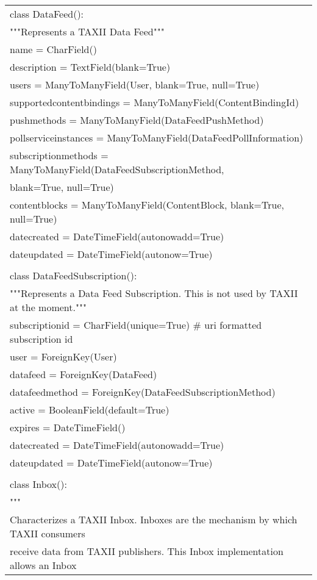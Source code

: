 \begin{center}
\begin{longtable}{|l|}
	\\
	class DataFeed():\\
	    """Represents a TAXII Data Feed"""\\
	    name = CharField()\\
	    description = TextField(blank=True)\\
	    users = ManyToManyField(User, blank=True, null=True)\\
	    supportedcontentbindings = ManyToManyField(ContentBindingId)\\
	    pushmethods = ManyToManyField(DataFeedPushMethod)\\
	    pollserviceinstances = ManyToManyField(DataFeedPollInformation)\\
	    subscriptionmethods = ManyToManyField(DataFeedSubscriptionMethod, \\
	    					blank=True, null=True)\\
	    contentblocks = ManyToManyField(ContentBlock, blank=True, null=True)\\
	    datecreated = DateTimeField(autonowadd=True)\\
	    dateupdated = DateTimeField(autonow=True)\\
	\\
	class DataFeedSubscription():\\
	    """Represents a Data Feed Subscription. This is not used by TAXII at the moment."""\\
	    subscriptionid = CharField(unique=True) \# uri formatted subscription id\\
	    user = ForeignKey(User)\\
	    datafeed = ForeignKey(DataFeed)\\
	    datafeedmethod = ForeignKey(DataFeedSubscriptionMethod)\\
	    active = BooleanField(default=True)\\
	    expires = DateTimeField()\\
	    datecreated = DateTimeField(autonowadd=True)\\
	    dateupdated = DateTimeField(autonow=True)\\
	\\
	class Inbox():\\
	    """\\
	    Characterizes a TAXII Inbox. Inboxes are the mechanism by which TAXII consumers\\
	    receive data from TAXII publishers. This Inbox implementation allows an Inbox\\

\end{longtable}
\end{center}

